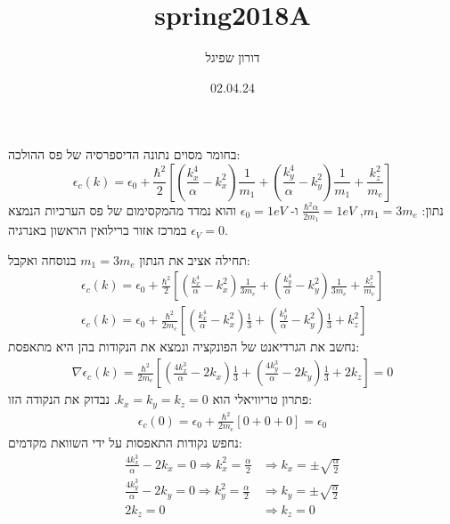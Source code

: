 \documentclass{article}
\title{spring2018A}
\author{דורון שפיגל}
\date{02.04.24}
\begin{document}
\maketitle
\begin{Question}%
בחומר מסוים נתונה הדיספרסיה של פס ההולכה:
\begin{equation*}
    \epsilon_{c}(k)= \epsilon_{0}+\frac{\hbar^2}{2}\left[ \left( \frac{k_{x}^4}{\alpha}-k_{x}^2 \right)\frac{1}{m_{1}}+\left( \frac{k_{y}^4}{\alpha}-k_{y}^2 \right)\frac{1}{m_{1}} + \frac{k_{z}^2}{m_{e}} \right]
\end{equation*}
נתון: $m_{1}=3m_{e}$, $\frac{\hbar^2\alpha}{2m_{1}}=1eV$ ו- $\epsilon_{0}=1eV$ והוא נמדד מהמקסימום של פס הערכיות הנמצא במרכז אזור ברילואין הראשון באנרגיה $\epsilon_{V}=0$.
\end{Question}
\begin{Answer}
תחילה אציב את הנתון $m_{1}=3m_{e}$ בנוסחה ואקבל:
\begin{align*}
        \epsilon_{c}(k)= \epsilon_{0}+\frac{\hbar^2}{2}\left[ \left( \frac{k_{x}^4}{\alpha}-k_{x}^2 \right)\frac{1}{3m_{e}}+\left( \frac{k_{y}^4}{\alpha}-k_{y}^2 \right)\frac{1}{3m_{e}} + \frac{k_{z}^2}{m_{e}} \right]\\
        \epsilon_{c}(k)= \epsilon_{0}+\frac{\hbar^2}{2m_{e}}\left[ \left( \frac{k_{x}^4}{\alpha}-k_{x}^2 \right)\frac{1}{3}+\left( \frac{k_{y}^4}{\alpha}-k_{y}^2 \right)\frac{1}{3} + k_{z}^2\right]
\end{align*}
נחשב את הגרדיאנט של הפונקציה ונמצא את הנקודות בהן היא מתאפסת:
\begin{align*}
    \nabla \epsilon_{c}(k)= \frac{\hbar^2}{2m_{e}}\left[ \left( \frac{4k_{x}^3}{\alpha}-2k_{x} \right)\frac{1}{3}+\left( \frac{4k_{y}^3}{\alpha}-2k_{y} \right)\frac{1}{3} + 2k_{z}\right]=0
\end{align*}
פתרון טריוויאלי הוא $k_{x}=k_{y}=k_{z}=0$. נבדוק את הנקודה הזו:
\begin{align*}
    \epsilon_{c}(0)= \epsilon_{0}+\frac{\hbar^2}{2m_{e}}\left[ 0+0+0\right]=\epsilon_{0}
\end{align*}
נחפש נקודות התאפסות על ידי השוואת מקדמים:
\begin{align*}
    \frac{4k_{x}^3}{\alpha}-2k_{x} = 0 \Rightarrow  k_{x}^2=\frac{\alpha}{2} &\Rightarrow k_{x}=\pm\sqrt{\frac{\alpha}{2}}\\
    \frac{4k_{y}^3}{\alpha}-2k_{y} = 0 \Rightarrow  k_{y}^2=\frac{\alpha}{2} &\Rightarrow k_{y}=\pm\sqrt{\frac{\alpha}{2}}\\
    2k_{z} = 0 &\Rightarrow k_{z}=0
\end{align*}

\end{Answer}
\end{document}
